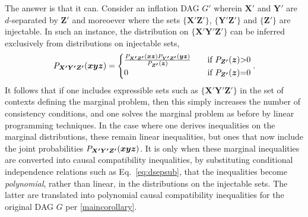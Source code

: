 \documentclass[aps,english,10pt,superscriptaddress,onecolumn,twoside,longbibliography,pra,floatfix,fleqn,nofootinbib]{revtex4-1}%
\newcommand*{\tblue}[1]{{\color{MidnightBlue}{\textbf{#1}}}}
\newcommand*{\tpurp}[1]{{\color{Plum}{{#1}}}}
\theoremstyle{definition}
\newcommand{\p}[2][]{{P_{#1}}\parenths{#2}}
\newcommand{\cramp}[1]{\ensuremath{\mathord{#1}}}
\DeclarePairedDelimiter{\parenths}{\lparen}{\rparen}
\begin{document}
\color{blue} The answer is that it can.  
 \color{black}
Consider an inflation DAG $G'$ wherein  $\bm{X'}$ and $\bm{Y'}$ are $d$-separated by $\bm{Z'}$ and moreoever where the sets $\{\bm{X'}\bm{Z'}\}$, $\{\bm{Y'}\bm{Z'}\}$ and $\{\bm{Z'}\}$ are injectable. In such an instance, the distribution on $\{\bm{X'}\bm{Y'}\bm{Z'}\}$ can be inferred exclusively from distributions on injectable sets,
\begin{align}\label{eq:dsepsub}
    \p[\bm{X'}\bm{Y'}\bm{Z'}]{\bm{x}\bm{y}\bm{z}}=\begin{cases}\frac{\p[\bm{X'}\bm{Z'}]{\bm{x}\bm{z}}\p[\bm{Y'}\bm{Z'}]{\bm{y}\bm{z}}}{\p[\bm{Z'}]{\bm{z}}} & \quad\text{if }\p[\bm{Z'}]{\bm{z}}\cramp{>}0 \\
    0 & \quad\text{if }\p[\bm{Z'}]{\bm{z}}\cramp{=} 0
    \end{cases}.
\end{align}
\color{blue} It follows that if one includes expressible sets such as $\{\bm{X'}\bm{Y'}\bm{Z'}\}$ in the set of contexts defining the marginal problem,
then this simply increases the number of consistency conditions, and one solves the marginal problem as before by linear programming techniques.  In the case where one derives inequalities on the marginal distributions, these remain linear inequalities, but ones that now include the joint probabilities $\p[\bm{X'}\bm{Y'}\bm{Z'}]{\bm{x}\bm{y}\bm{z}}$.  It is only when these marginal inequalities are converted into causal compatibility inequalities, by substituting conditional independence relations such as Eq.~\eqref{eq:dsepsub}, that the inequalities become {\em polynomial}, rather than linear, in the distributions on the injectable sets.   \color{black}
The latter are translated into polynomial causal compatibility inequalities for the original DAG $G$ per \cref{maincorollary}.  
\end{document}
